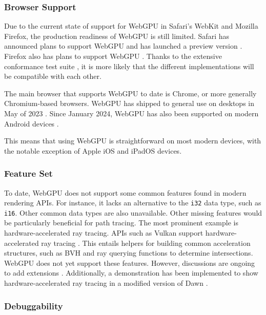 \subsubsection*{Browser Support}

Due to the current state of support for \gls{WebGPU} in Safari's \gls{WebKit} and Mozilla Firefox, the production readiness of \gls{WebGPU} is still limited. Safari has announced plans to support \gls{WebGPU} and has launched a preview version \cite{SafariWebGPUSupport}. Firefox also has plans to support \gls{WebGPU} \cite{FirefoxWebGPUSupport}. Thanks to the extensive conformance test suite \cite{WebGPUConformanceTestSuite}, it is more likely that the different implementations will be compatible with each other.

The main browser that supports \gls{WebGPU} to date is Chrome, or more generally \gls{Chromium}-based browsers. \gls{WebGPU} has shipped to general use on desktops in May of 2023 \cite{ChromeWebGPUSupport}. Since January 2024, \gls{WebGPU} has also been supported on modern Android devices \cite{ChromeAndroidWebGPUSupport}.

This means that using \gls{WebGPU} is straightforward on most modern devices, with the notable exception of Apple iOS and iPadOS devices.

\subsubsection*{Feature Set}

To date, \gls{WebGPU} does not support some common features found in modern rendering \glspl{API}. For instance, it lacks an alternative to the \texttt{i32} data type, such as \texttt{i16}. Other common data types are also unavailable. Other missing features would be particularly beneficial for path tracing. The most prominent example is hardware-accelerated ray tracing. \glspl{API} such as \gls{Vulkan} support hardware-accelerated ray tracing \cite{vulkanRayTracing}. This entails helpers for building common acceleration structures, such as \gls{BVH} and ray querying functions to determine intersections. \gls{WebGPU} does not yet support these features. However, discussions are ongoing to add extensions \cite{webGPURayTracing}. Additionally, a demonstration has been implemented to show hardware-accelerated ray tracing in a modified version of \gls{Dawn} \cite{webGPURayTracingFork}.

\subsubsection*{Debuggability}

